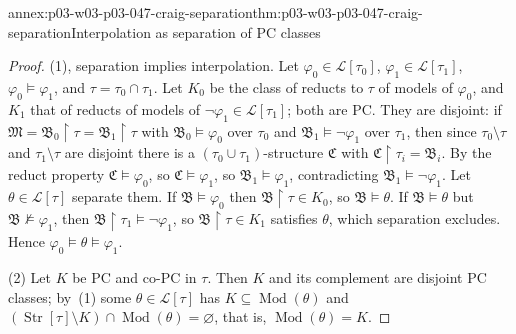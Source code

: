 \begin{annexitem}{annex:p03-w03-p03-047-craig-separation}{thm:p03-w03-p03-047-craig-separation}{Interpolation as separation of PC classes}
\begin{proof}
(1), separation implies interpolation.  Let \(\varphi_0\in\mathscr L[\tau_0]\),
\(\varphi_1\in\mathscr L[\tau_1]\), \(\varphi_0\models\varphi_1\), and
\(\tau=\tau_0\cap\tau_1\).  Let \(K_0\) be the class of reducts to \(\tau\) of
models of \(\varphi_0\), and \(K_1\) that of reducts of models of
\(\neg\varphi_1\in\mathscr L[\tau_1]\); both are PC.  They are disjoint: if
\(\mathfrak M=\mathfrak B_0\restriction\tau=\mathfrak B_1\restriction\tau\)
with \(\mathfrak B_0\models\varphi_0\) over \(\tau_0\) and
\(\mathfrak B_1\models\neg\varphi_1\) over \(\tau_1\), then since
\(\tau_0\setminus\tau\) and \(\tau_1\setminus\tau\) are disjoint there is a
\((\tau_0\cup\tau_1)\)-structure \(\mathfrak C\) with
\(\mathfrak C\restriction\tau_i=\mathfrak B_i\).  By the reduct property
\(\mathfrak C\models\varphi_0\), so \(\mathfrak C\models\varphi_1\), so
\(\mathfrak B_1\models\varphi_1\), contradicting
\(\mathfrak B_1\models\neg\varphi_1\).  Let \(\theta\in\mathscr L[\tau]\)
separate them.  If \(\mathfrak B\models\varphi_0\) then
\(\mathfrak B\restriction\tau\in K_0\), so \(\mathfrak B\models\theta\).  If
\(\mathfrak B\models\theta\) but \(\mathfrak B\not\models\varphi_1\), then
\(\mathfrak B\restriction\tau_1\models\neg\varphi_1\), so
\(\mathfrak B\restriction\tau\in K_1\) satisfies \(\theta\), which separation
excludes.  Hence \(\varphi_0\models\theta\models\varphi_1\).

(2) Let \(K\) be PC and co-PC in \(\tau\).  Then \(K\) and its complement are
disjoint PC classes; by~(1) some \(\theta\in\mathscr L[\tau]\) has
\(K\subseteq\operatorname{Mod}(\theta)\) and
\((\operatorname{Str}[\tau]\setminus K)\cap\operatorname{Mod}(\theta)=\varnothing\),
that is, \(\operatorname{Mod}(\theta)=K\).
\end{proof}
\end{annexitem}

